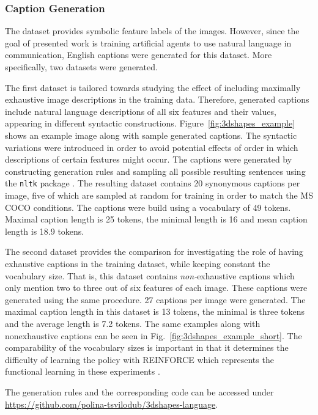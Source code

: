 \subsubsection{Caption Generation}

The dataset provides symbolic feature labels of the images. However, since the goal of presented work is training artificial agents to use natural language in communication, English captions were generated for this dataset. More specifically, two datasets were generated. 

The first dataset is tailored towards studying the effect of including maximally exhaustive image descriptions in the training data. Therefore, generated captions include natural language descriptions of all six features and their values, appearing in different syntactic constructions. Figure~\ref{fig:3dshapes_example} shows an example image along with sample generated captions. The syntactic variations were introduced in order to avoid potential effects of order in which descriptions of certain features might occur.
The captions were generated by constructing generation rules and sampling all possible resulting sentences using the \texttt{nltk} package \parencite{bird2006nltk}. The resulting dataset contains 20 synonymous captions per image, five of which are sampled at random for training in order to match the MS COCO conditions. The captions were build using a vocabulary of 49 tokens. Maximal caption length is 25 tokens, the minimal length is 16 and mean caption length is 18.9 tokens. 

The second dataset provides the comparison for investigating the role of having exhaustive captions in the training dataset, while keeping constant the vocabulary size. That is, this dataset contains \textit{non-}exhaustive captions which only mention two to three out of six features of each image. These captions were generated using the same procedure. 27 captions per image were generated. The maximal caption length in this dataset is 13 tokens, the minimal is three tokens and the average length is 7.2 tokens.
The same examples along with nonexhaustive captions can be seen in Fig.~\ref{fig:3dshapes_example_short}.
The comparability of the vocabulary sizes is important in that it determines the difficulty of learning the policy with REINFORCE which represents the functional learning in these experiments \parencite[cf.][]{havrylov2017emergence}.

The generation rules and the corresponding code can be accessed under \url{https://github.com/polina-tsvilodub/3dshapes-language}.

